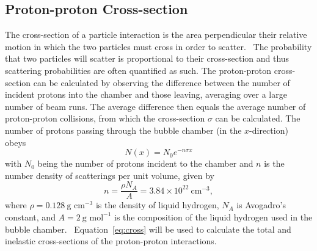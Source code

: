 \documentclass[twocolumn]{article}
\begin{document}
\subsection{Proton-proton Cross-section}
The cross-section of a particle interaction is the area perpendicular their relative motion in which the two particles must cross in order to scatter.~\cite{Thompson} The probability that two particles will scatter is proportional to their cross-section and thus scattering probabilities are often quantified as such. The proton-proton cross-section can be calculated by observing the difference between the number of incident protons into the chamber and those leaving, averaging over a large number of beam runs. The average difference then equals the average number of proton-proton collisions, from which the cross-section $\sigma$ can be calculated. The number of protons passing through the bubble chamber (in the $x$-direction) obeys~\cite{seul}
\begin{equation} \label{eq:cross}
N(x) = N_0 e^{-n \sigma x}
\end{equation}
with $N_0$ being the number of protons incident to the chamber and $n$ is the number density of scatterings per unit volume, given by
\begin{equation*}
n = \frac {\rho N_A} {A} = 3.84 \times 10^{22} ~\text{cm}^{-3},
\end{equation*}
where $\rho=0.128 ~\text{g cm}^{-3}$ is the density of liquid hydrogen, $N_A$ is Avogadro's constant, and $A=2 ~\text{g mol}^{-1}$ is the composition of the liquid hydrogen used in the bubble chamber.~\cite{harigel} Equation~\ref{eq:cross} will be used to calculate the total and inelastic cross-sections of the proton-proton interactions.
\end{document}
